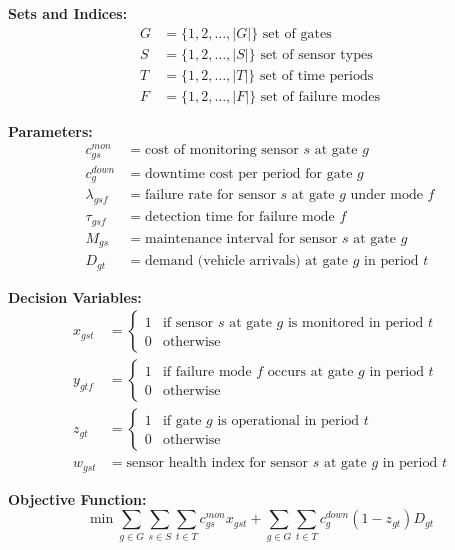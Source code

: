 \documentclass{article}
\begin{document}
\textbf{Sets and Indices:}
\begin{align}
G &= \{1, 2, \ldots, |G|\} \text{ set of gates} \\
S &= \{1, 2, \ldots, |S|\} \text{ set of sensor types} \\
T &= \{1, 2, \ldots, |T|\} \text{ set of time periods} \\
F &= \{1, 2, \ldots, |F|\} \text{ set of failure modes}
\end{align}

\textbf{Parameters:}
\begin{align}
c_{gs}^{mon} &= \text{cost of monitoring sensor } s \text{ at gate } g \\
c_{g}^{down} &= \text{downtime cost per period for gate } g \\
\lambda_{gsf} &= \text{failure rate for sensor } s \text{ at gate } g \text{ under mode } f \\
\tau_{gsf} &= \text{detection time for failure mode } f \\
M_{gs} &= \text{maintenance interval for sensor } s \text{ at gate } g \\
D_{gt} &= \text{demand (vehicle arrivals) at gate } g \text{ in period } t
\end{align}

\textbf{Decision Variables:}
\begin{align}
x_{gst} &= \begin{cases} 1 & \text{if sensor } s \text{ at gate } g \text{ is monitored in period } t \\ 0 & \text{otherwise} \end{cases} \\
y_{gtf} &= \begin{cases} 1 & \text{if failure mode } f \text{ occurs at gate } g \text{ in period } t \\ 0 & \text{otherwise} \end{cases} \\
z_{gt} &= \begin{cases} 1 & \text{if gate } g \text{ is operational in period } t \\ 0 & \text{otherwise} \end{cases} \\
w_{gst} &= \text{sensor health index for sensor } s \text{ at gate } g \text{ in period } t
\end{align}

\textbf{Objective Function:}
\begin{equation}
\min \sum_{g \in G} \sum_{s \in S} \sum_{t \in T} c_{gs}^{mon} x_{gst} + \sum_{g \in G} \sum_{t \in T} c_{g}^{down} (1 - z_{gt}) D_{gt}
\end{equation}
\end{document}
